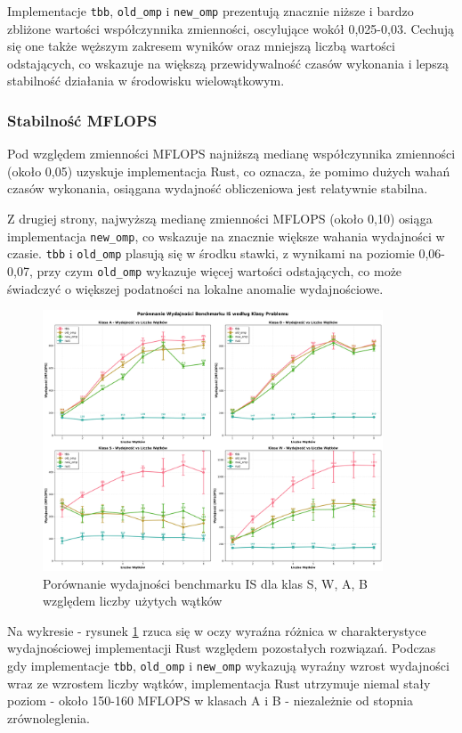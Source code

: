 Implementacje \texttt{tbb}, \texttt{old\_omp} i \texttt{new\_omp} prezentują znacznie niższe i bardzo zbliżone wartości współczynnika zmienności, oscylujące wokół 0,025-0,03. Cechują się one także węższym zakresem wyników oraz mniejszą liczbą wartości odstających, co wskazuje na większą przewidywalność czasów wykonania i lepszą stabilność działania w środowisku wielowątkowym.

\subsubsection{Stabilność MFLOPS}
Pod względem zmienności MFLOPS najniższą medianę współczynnika zmienności (około 0,05) uzyskuje implementacja Rust, co oznacza, że pomimo dużych wahań czasów wykonania, osiągana wydajność obliczeniowa jest relatywnie stabilna.

Z drugiej strony, najwyższą medianę zmienności MFLOPS (około 0,10) osiąga implementacja \texttt{new\_omp}, co wskazuje na znacznie większe wahania wydajności w czasie. \texttt{tbb} i \texttt{old\_omp} plasują się w środku stawki, z wynikami na poziomie 0,06-0,07, przy czym \texttt{old\_omp} wykazuje więcej wartości odstających, co może świadczyć o większej podatności na lokalne anomalie wydajnościowe.


\begin{figure}[H]
    \centering
    \includegraphics[width=0.9\textwidth]{analiza/images/parallel/is/x86/is_porownanie_wydajnosci.png}
    \caption{Porównanie wydajności benchmarku IS dla klas S, W, A, B względem liczby użytych wątków}
    \label{is_porownanie_wydajnosci_x86}
\end{figure}
Na wykresie - rysunek \ref{is_porownanie_wydajnosci_x86} rzuca się w oczy wyraźna różnica w charakterystyce wydajnościowej implementacji Rust względem pozostałych rozwiązań. Podczas gdy implementacje \texttt{tbb}, \texttt{old\_omp} i \texttt{new\_omp} wykazują wyraźny wzrost wydajności wraz ze wzrostem liczby wątków, implementacja Rust utrzymuje niemal stały poziom - około 150-160 MFLOPS w klasach A i B - niezależnie od stopnia zrównoleglenia.


